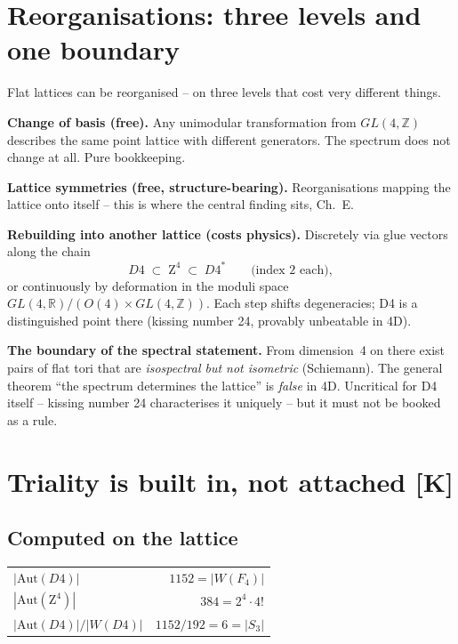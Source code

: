 \documentclass[11pt]{report}
\begin{document}
\chapter{Reorganisations: three levels and one boundary}

Flat lattices can be reorganised -- on three levels that cost very
different things.

\textbf{Change of basis (free).} Any unimodular transformation from
$GL(4,\mathbb{Z})$ describes the same point lattice with different
generators. The spectrum does not change at all. Pure bookkeeping.

\textbf{Lattice symmetries (free, structure-bearing).}
Reorganisations mapping the lattice onto itself -- this is where the
central finding sits, Ch.~E.

\textbf{Rebuilding into another lattice (costs physics).} Discretely
via glue vectors along the chain
\begin{equation}
  D4 \;\subset\; \text{Z}^4 \;\subset\; D4^{*}
  \qquad\text{(index 2 each)},
\end{equation}
or continuously by deformation in the moduli space
$GL(4,\mathbb{R})/(O(4)\times GL(4,\mathbb{Z}))$. Each step shifts
degeneracies; D4 is a distinguished point there (kissing number 24,
provably unbeatable in 4D).

\textbf{The boundary of the spectral statement.} From dimension~4 on
there exist pairs of flat tori that are \emph{isospectral but not
isometric} (Schiemann). The general theorem \enquote{the spectrum
determines the lattice} is \emph{false} in 4D. Uncritical for D4
itself -- kissing number 24 characterises it uniquely -- but it must
not be booked as a rule.

\chapter{Triality is built in, not attached [K]}

\section{Computed on the lattice}

\begin{center}
\begin{tabular}{lr}
\toprule
$|\text{Aut}(D4)|$ & $1152 = |W(F_4)|$ \\
$|\text{Aut}(\text{Z}^4)|$ & $384 = 2^4\cdot4!$ \\
$|\text{Aut}(D4)|/|W(D4)|$ & $1152/192 = 6 = |S_3|$ \\
\bottomrule
\end{tabular}
\end{center}
\end{document}
